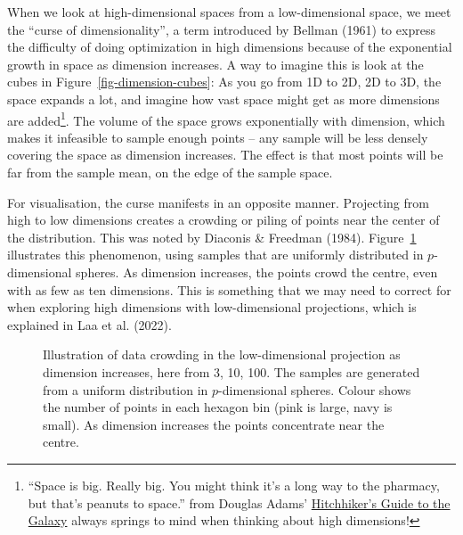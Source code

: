 \documentclass[
  letterpaper,
]{krantz}
\begin{document}
When we look at high-dimensional spaces from a low-dimensional space, we
meet the ``curse of dimensionality'', a term introduced by Bellman
(1961) to express the difficulty of doing optimization in high
dimensions because of the exponential growth in space as dimension
increases. A way to imagine this is look at the cubes in
Figure~\ref{fig-dimension-cubes}: As you go from 1D to 2D, 2D to 3D, the
space expands a lot, and imagine how vast space might get as more
dimensions are added\footnote{``Space is big. Really big. You might
  think it's a long way to the pharmacy, but that's peanuts to space.''
  from Douglas Adams'
  \href{https://en.wikipedia.org/wiki/The_Hitchhiker\%27s_Guide_to_the_Galaxy\#Stage_shows}{Hitchhiker's
  Guide to the Galaxy} always springs to mind when thinking about high
  dimensions!}. The volume of the space grows exponentially with
dimension, which makes it infeasible to sample enough points -- any
sample will be less densely covering the space as dimension increases.
The effect is that most points will be far from the sample mean, on the
edge of the sample space.


For visualisation, the curse manifests in an opposite manner. Projecting
from high to low dimensions creates a crowding or piling of points near
the center of the distribution. This was noted by Diaconis \& Freedman
(1984). Figure~\ref{fig-density} illustrates this phenomenon, using
samples that are uniformly distributed in \(p\)-dimensional spheres. As
dimension increases, the points crowd the centre, even with as few as
ten dimensions. This is something that we may need to correct for when
exploring high dimensions with low-dimensional projections, which is
explained in Laa et al. (2022).

 

\begin{figure}


\caption{\label{fig-density}Illustration of data crowding in the
low-dimensional projection as dimension increases, here from 3, 10, 100.
The samples are generated from a uniform distribution in
\(p\)-dimensional spheres. Colour shows the number of points in each
hexagon bin (pink is large, navy is small). As dimension increases the
points concentrate near the centre.}

\end{figure}%
\end{document}
